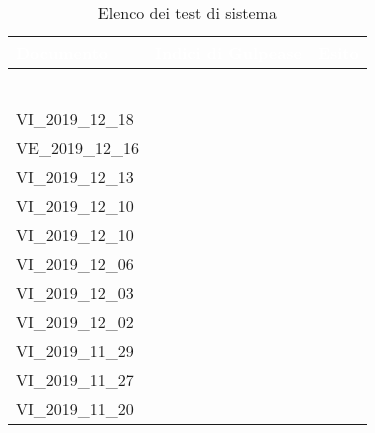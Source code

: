 {
\renewcommand{\arraystretch}{1.5}
\centering
\begin{longtable}{ C{4cm} | C{4cm} | C{4cm} }
\caption{Elenco dei test di sistema}\\
\textcolor{white}{\textbf{Documento}} & \textcolor{white}{\textbf{Indici di Gulpease}} & \textcolor{white}{\textbf{Esito}} \\
\hline
\endhead
{} &  & \\
 &  & \\
 &  & \\

 &  & \\
 &  & \\

 &  & \\

VI\_2019\_12\_18 & & \\
VE\_2019\_12\_16 & & \\
VI\_2019\_12\_13 & & \\
VI\_2019\_12\_10 & & \\
VI\_2019\_12\_10 & & \\
VI\_2019\_12\_06 & & \\
VI\_2019\_12\_03 & & \\
VI\_2019\_12\_02 & & \\
VI\_2019\_11\_29 & & \\
VI\_2019\_11\_27 & & \\
VI\_2019\_11\_20 & & \\

\end{longtable}
}